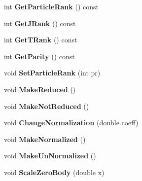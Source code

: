 \begin{DoxyCompactItemize}
\item 
int {\bfseries Get\+Particle\+Rank} () const \hypertarget{classOperator_a16a917d45b7d8c03868b6cd80b9efe7f}{}\label{classOperator_a16a917d45b7d8c03868b6cd80b9efe7f}

\item 
int {\bfseries Get\+J\+Rank} () const \hypertarget{classOperator_a5f12467caae7d72bad32ea5b7c378899}{}\label{classOperator_a5f12467caae7d72bad32ea5b7c378899}

\item 
int {\bfseries Get\+T\+Rank} () const \hypertarget{classOperator_af01419ad8d7a4097f5520ae6d533e93f}{}\label{classOperator_af01419ad8d7a4097f5520ae6d533e93f}

\item 
int {\bfseries Get\+Parity} () const \hypertarget{classOperator_a7b3d8e2ca9f0ba631b59220cf04dbe39}{}\label{classOperator_a7b3d8e2ca9f0ba631b59220cf04dbe39}

\item 
void {\bfseries Set\+Particle\+Rank} (int pr)\hypertarget{classOperator_a77eb97b1309a1c4e20101217903b9771}{}\label{classOperator_a77eb97b1309a1c4e20101217903b9771}

\item 
void {\bfseries Make\+Reduced} ()\hypertarget{classOperator_ad2ec2d4cf6d17b1b7b7afc86bc03c6ed}{}\label{classOperator_ad2ec2d4cf6d17b1b7b7afc86bc03c6ed}

\item 
void {\bfseries Make\+Not\+Reduced} ()\hypertarget{classOperator_add4e26b5eb6534daed5cd40899456ed0}{}\label{classOperator_add4e26b5eb6534daed5cd40899456ed0}

\item 
void {\bfseries Change\+Normalization} (double coeff)\hypertarget{classOperator_a4a4ebafd34f06272c1b207d61a5cfd2d}{}\label{classOperator_a4a4ebafd34f06272c1b207d61a5cfd2d}

\item 
void {\bfseries Make\+Normalized} ()\hypertarget{classOperator_a64c6b761468d1983610c5c9d26f84222}{}\label{classOperator_a64c6b761468d1983610c5c9d26f84222}

\item 
void {\bfseries Make\+Un\+Normalized} ()\hypertarget{classOperator_a93511274ce2cc52d0facb2a38fae91af}{}\label{classOperator_a93511274ce2cc52d0facb2a38fae91af}

\item 
void {\bfseries Scale\+Zero\+Body} (double x)\hypertarget{classOperator_a3a25803bc77344396f2dd0e75d2a020d}{}\label{classOperator_a3a25803bc77344396f2dd0e75d2a020d}


\end{DoxyCompactItemize}

